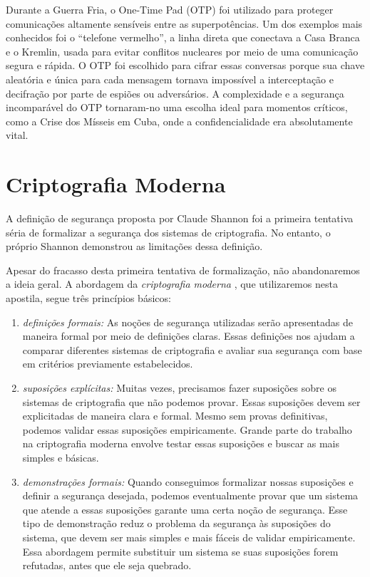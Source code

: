 Durante a Guerra Fria, o One-Time Pad (OTP) foi utilizado para proteger comunicações altamente sensíveis entre as superpotências.
Um dos exemplos mais conhecidos foi o ``telefone vermelho'', a linha direta que conectava a Casa Branca e o Kremlin, usada para evitar conflitos nucleares por meio de uma comunicação segura e rápida.
O OTP foi escolhido para cifrar essas conversas porque sua chave aleatória e única para cada mensagem tornava impossível a interceptação e decifração por parte de espiões ou adversários.
A complexidade e a segurança incomparável do OTP tornaram-no uma escolha ideal para momentos críticos, como a Crise dos Mísseis em Cuba, onde a confidencialidade era absolutamente vital.

\section{Criptografia Moderna}

A definição de segurança proposta por Claude Shannon foi a primeira tentativa séria de formalizar a segurança dos sistemas de criptografia.
No entanto, o próprio Shannon demonstrou as limitações dessa definição.

Apesar do fracasso desta primeira tentativa de formalização, não abandonaremos a ideia geral.
A abordagem da {\em criptografia moderna} \cite{Goldwasser84}, que utilizaremos nesta apostila, segue três princípios básicos:
\begin{enumerate}
\item {\em definições formais:}
  As noções de segurança utilizadas serão apresentadas de maneira formal por meio de definições claras.
  Essas definições nos ajudam a comparar diferentes sistemas de criptografia e avaliar sua segurança com base em critérios previamente estabelecidos.
\item {\em suposições explícitas:}
  Muitas vezes, precisamos fazer suposições sobre os sistemas de criptografia que não podemos provar.
  Essas suposições devem ser explicitadas de maneira clara e formal.
  Mesmo sem provas definitivas, podemos validar essas suposições empiricamente.
  Grande parte do trabalho na criptografia moderna envolve testar essas suposições e buscar as mais simples e básicas.
\item {\em demonstrações formais:}
  Quando conseguimos formalizar nossas suposições e definir a segurança desejada, podemos eventualmente provar que um sistema que atende a essas suposições garante uma certa noção de segurança.
  Esse tipo de demonstração reduz o problema da segurança às suposições do sistema, que devem ser mais simples e mais fáceis de validar empiricamente.
  Essa abordagem permite substituir um sistema se suas suposições forem refutadas, antes que ele seja quebrado.
\end{enumerate}

